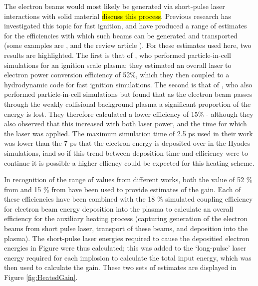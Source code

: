 The electron beams would most likely be generated via short-pulse laser interactions with solid material \hl{discuss this process}. Previous research has investigated this topic for fast ignition, and have produced a range of estimates for the efficiencies with which such beams can be generated and transported (some examples are \cite{Ma2012, Kemp2014, Kemp2009}, and the review article \cite{Norreys2014}). For these estimates used here, two results are highlighted. The first is that of \cite{Strozzi2012}, who performed particle-in-cell simulations for an ignition scale plasma; they estimated an overall laser to electron power conversion efficiency of 52\%, which they then coupled to a hydrodynamic code for fast ignition simulations. The second is that of \cite{Tonge2009}, who also performed particle-in-cell simulations but found that as the electron beam passes through the weakly collisional background plasma a significant proportion of the energy is lost. They therefore calculated a lower efficiency of 15\% - although they also observed that this increased with both laser power, and the time for which the laser was applied. The maximum simulation time of 2.5 ps used in their work was lower than the 7 ps that the electron energy is deposited over in the Hyades simulations, iand so if this trend between deposition time and efficiency were to continue it is possible a higher effiency could be expected for this heating scheme.

In recognition of the range of values from different works, both the value of 52 \% from \cite{Strozzi2012} and 15 \% from \cite{Tonge2009} have been used to provide estimates of the gain. Each of these efficiencies have been combined with the 18 \% simulated coupling efficiency for electron beam energy deposition into the plasma to calculate an overall efficiency for the auxiliary heating process (capturing generation of the electron beams from short pulse laser, transport of these beams, and deposition into the plasma). The short-pulse laser energies required to cause the depositied electron energies in Figure \label{fig:HeatingPower} were thus calculated; this was added to the `long-pulse' laser energy required for each implosion to calculate the total input energy, which was then used to calculate the gain. These two sets of estimates are displayed in Figure \ref{fig:HeatedGain}.

